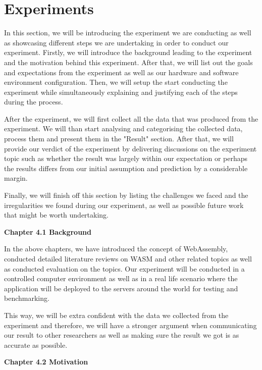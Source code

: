 \chapter{Experiments} \label{chap:experiments}

In this section, we will be introducing the experiment we are conducting as well as showcasing different steps we are undertaking in order to conduct our experiment. Firstly, we will introduce the background leading to the experiment and the motivation behind this experiment. After that, we will list out the goals and expectations from the experiment as well as our hardware and software environment configuration. Then, we will setup the start conducting the experiment while simultaneously explaining and justifying each of the steps during the process.

After the experiment, we will first collect all the data that was produced from the experiment. We will than start analysing and categorising the collected data, process them and present them in the "Result" section. After that, we will provide our verdict of the experiment by delivering discussions on the experiment topic such as whether the result was largely within our expectation or perhaps the results differs from our initial assumption and prediction by a considerable margin.

Finally, we will finish off this section by listing the challenges we faced and the irregularities we found during our experiment, as well as possible future work that might be worth undertaking.

\bigskip
\bigskip

\textbf{{\Large Chapter 4.1 Background}}

\bigskip

In the above chapters, we have introduced the concept of WebAssembly, conducted detailed literature reviews on WASM and other related topics as well as conducted evaluation on the topics. Our experiment will be conducted in a controlled computer environment as well as in a real life scenario where the application will be deployed to the servers around the world for testing and benchmarking.

This way, we will be extra confident with the data we collected from the experiment and therefore, we will have a stronger argument when communicating our result to other researchers as well as making sure the result we got is as accurate as possible.

\bigskip
\bigskip

\textbf{{\Large Chapter 4.2 Motivation}}

